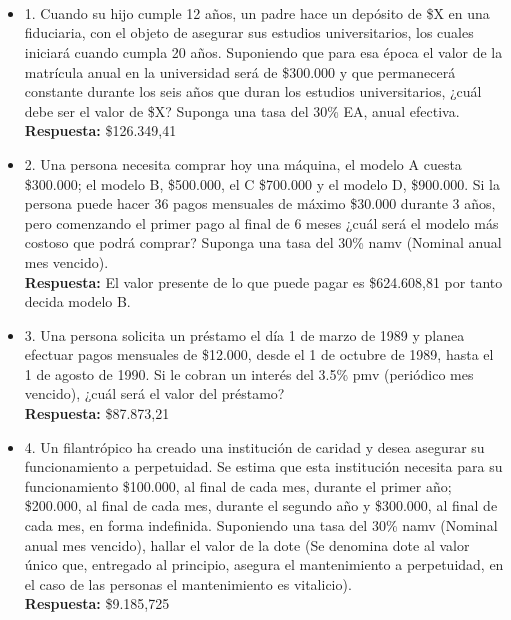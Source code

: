 \begin{itemize}
\end{itemize}\
\newpage


\chapter*{}

\begin{itemize}

	\item 1. Cuando su hijo cumple 12 años, un padre hace un depósito de \$X en una fiduciaria, con el objeto de asegurar sus estudios universitarios, los cuales iniciará cuando cumpla 20 años. Suponiendo que para esa época el valor de la matrícula anual en la universidad será de \$300.000 y que permanecerá constante durante los seis años que duran los estudios universitarios, ¿cuál debe ser el valor de \$X? Suponga una tasa del 30\% EA, anual efectiva.\\
	      \textbf{Respuesta:} \$126.349,41\\
	      \medskip
	      
	\item 2. Una persona necesita comprar hoy una máquina, el modelo A cuesta \$300.000; el modelo B, \$500.000, el C \$700.000 y el modelo D, \$900.000. Si la persona puede hacer 36 pagos mensuales de máximo \$30.000 durante 3 años, pero comenzando el primer pago al final de 6 meses ¿cuál será el modelo más costoso que podrá comprar? Suponga una tasa del 30\% namv (Nominal anual mes vencido).\\
	      \textbf{Respuesta:} El valor presente de lo que puede pagar es \$624.608,81 por tanto decida modelo B.\\
	      \medskip
	      
	\item 3. Una persona solicita un préstamo el día 1 de marzo de 1989 y planea efectuar pagos mensuales de \$12.000, desde el 1 de octubre de 1989, hasta el 1 de agosto de 1990. Si le cobran un interés del 3.5\% pmv (periódico mes vencido), ¿cuál será el valor del préstamo?\\
	      \textbf{Respuesta:} \$87.873,21\\
	      \medskip
	      
	\item 4. Un filantrópico ha creado una institución de caridad y desea asegurar su funcionamiento a perpetuidad. Se estima que esta institución necesita para su funcionamiento \$100.000, al final de cada mes, durante el primer año; \$200.000, al final de cada mes, durante el segundo año y \$300.000, al final de cada mes, en forma indefinida. Suponiendo una tasa del 30\% namv (Nominal anual mes vencido), hallar el valor de la dote (Se denomina dote al valor único que, entregado al principio, asegura el mantenimiento a perpetuidad, en el caso de las personas el mantenimiento es vitalicio).\\
	      \textbf{Respuesta:} \$9.185,725\\
	      \medskip
	      

\end{itemize}

